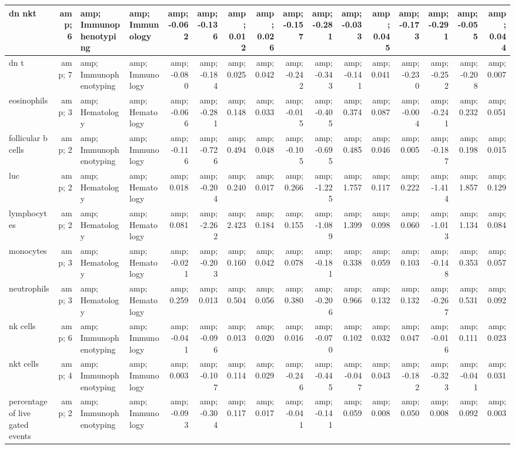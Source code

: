 \documentclass[]{article}
\begin{document}
\begin{table}
\begin{tabular}[t]{l|r|l|l|r|r|r|r|r|r|r|r|r|r|r|r}
\hline
dn nkt &amp; 6 &amp; Immunophenotyping &amp; Immunology &amp; -0.062 &amp; -0.136 &amp; 0.012 &amp; 0.026 &amp; -0.157 &amp; -0.281 &amp; -0.033 &amp; 0.045 &amp; -0.173 &amp; -0.291 &amp; -0.055 &amp; 0.044\\
\hline
dn t &amp; 7 &amp; Immunophenotyping &amp; Immunology &amp; -0.080 &amp; -0.184 &amp; 0.025 &amp; 0.042 &amp; -0.242 &amp; -0.343 &amp; -0.141 &amp; 0.041 &amp; -0.230 &amp; -0.252 &amp; -0.208 &amp; 0.007\\
\hline
eosinophils &amp; 3 &amp; Hematology &amp; Hematology &amp; -0.066 &amp; -0.281 &amp; 0.148 &amp; 0.033 &amp; -0.015 &amp; -0.405 &amp; 0.374 &amp; 0.087 &amp; -0.004 &amp; -0.241 &amp; 0.232 &amp; 0.051\\
\hline
follicular b cells &amp; 2 &amp; Immunophenotyping &amp; Immunology &amp; -0.116 &amp; -0.726 &amp; 0.494 &amp; 0.048 &amp; -0.105 &amp; -0.695 &amp; 0.485 &amp; 0.046 &amp; 0.005 &amp; -0.187 &amp; 0.198 &amp; 0.015\\
\hline
luc &amp; 2 &amp; Hematology &amp; Hematology &amp; 0.018 &amp; -0.204 &amp; 0.240 &amp; 0.017 &amp; 0.266 &amp; -1.225 &amp; 1.757 &amp; 0.117 &amp; 0.222 &amp; -1.414 &amp; 1.857 &amp; 0.129\\
\hline
lymphocytes &amp; 2 &amp; Hematology &amp; Hematology &amp; 0.081 &amp; -2.262 &amp; 2.423 &amp; 0.184 &amp; 0.155 &amp; -1.089 &amp; 1.399 &amp; 0.098 &amp; 0.060 &amp; -1.013 &amp; 1.134 &amp; 0.084\\
\hline
monocytes &amp; 3 &amp; Hematology &amp; Hematology &amp; -0.021 &amp; -0.203 &amp; 0.160 &amp; 0.042 &amp; 0.078 &amp; -0.181 &amp; 0.338 &amp; 0.059 &amp; 0.103 &amp; -0.148 &amp; 0.353 &amp; 0.057\\
\hline
neutrophils &amp; 3 &amp; Hematology &amp; Hematology &amp; 0.259 &amp; 0.013 &amp; 0.504 &amp; 0.056 &amp; 0.380 &amp; -0.206 &amp; 0.966 &amp; 0.132 &amp; 0.132 &amp; -0.267 &amp; 0.531 &amp; 0.092\\
\hline
nk cells &amp; 6 &amp; Immunophenotyping &amp; Immunology &amp; -0.041 &amp; -0.096 &amp; 0.013 &amp; 0.020 &amp; 0.016 &amp; -0.070 &amp; 0.102 &amp; 0.032 &amp; 0.047 &amp; -0.016 &amp; 0.111 &amp; 0.023\\
\hline
nkt cells &amp; 4 &amp; Immunophenotyping &amp; Immunology &amp; 0.003 &amp; -0.107 &amp; 0.114 &amp; 0.029 &amp; -0.246 &amp; -0.445 &amp; -0.047 &amp; 0.043 &amp; -0.182 &amp; -0.323 &amp; -0.041 &amp; 0.031\\
\hline
percentage of live gated events &amp; 2 &amp; Immunophenotyping &amp; Immunology &amp; -0.093 &amp; -0.304 &amp; 0.117 &amp; 0.017 &amp; -0.041 &amp; -0.141 &amp; 0.059 &amp; 0.008 &amp; 0.050 &amp; 0.008 &amp; 0.092 &amp; 0.003\\

\end{tabular}
\end{table}
\end{document}
